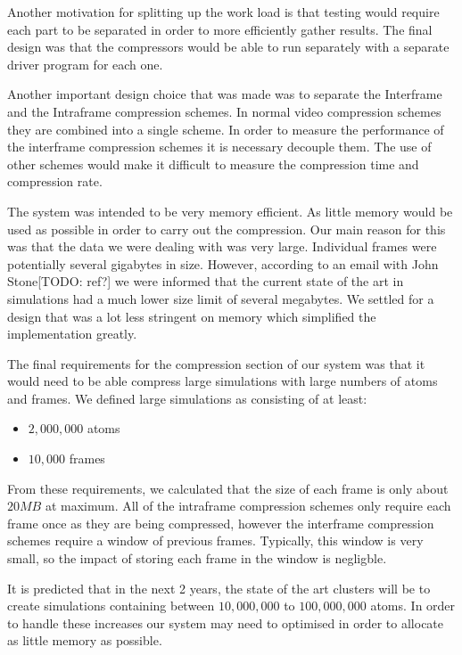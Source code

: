 \documentclass[a4paper,11pt]{report}
\begin{document}
Another motivation for splitting up the work load is that testing would require each part to be separated in order to more efficiently gather results. The final design was that the compressors would be able to run separately with a separate driver program for each one.

Another important design choice that was made was to separate the Interframe and the Intraframe compression schemes. In normal video compression schemes they are combined into a single scheme. In order to measure the performance of the interframe compression schemes it is necessary decouple them. The use of other schemes would make it difficult to measure the compression time and compression rate. 
 
The system was intended to be very memory efficient. As little memory would be used as possible in order to carry out the compression. Our main reason for this was that the data we were dealing with was very large. Individual frames were potentially several gigabytes in size. However, according to an email with John Stone[TODO: ref?] we were informed that the current state of the art in simulations had a much lower size limit of several megabytes. We settled for a design that was a lot less stringent on memory which simplified the implementation greatly.

The final requirements for the compression section of our system was that it would need to be able compress large simulations with large numbers of atoms and frames. We defined large simulations as consisting of at least:

\begin{itemize}
 \item $2,000,000$ atoms
 \item $10,000$ frames
\end{itemize}

From these requirements, we calculated that the size of each frame is only about $20MB$ at maximum. All of the intraframe compression schemes only require each frame once as they are being compressed, however the interframe compression schemes require a window of previous frames. Typically, this window is very small, so the impact of storing each frame in the window is negligble.

It is predicted that in the next 2 years, the state of the art clusters will be to create simulations containing between $10,000,000$ to $100,000,000$ atoms. In order to handle these increases our system may need to optimised in order to allocate as little memory as possible.
\end{document}
